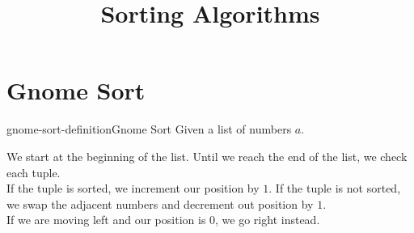 \documentclass[preview]{standalone}
\begin{document}
\title{Sorting Algorithms}
\genpage

\section{Gnome Sort}

\begin{snippetdefinition}{gnome-sort-definition}{Gnome Sort}
    Given a list of numbers \(a\).

    We start at the beginning of the list. Until we reach the end of the list, we check each tuple. \\
    If the tuple is sorted, we increment our position by \(1\). If the tuple is not sorted, we swap the adjacent numbers and decrement out position by \(1\). \\
    If we are moving left and our position is \(0\), we go right instead.
\end{snippetdefinition}

%
\end{document}
